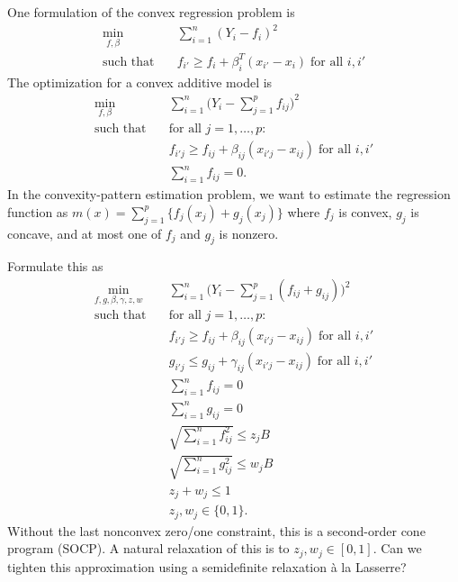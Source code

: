 \documentclass[12pt]{imsart}
\numberwithin{equation}{section}
\theoremstyle{plain}
\theoremstyle{remark}
\begin{document}
\begin{frontmatter}
\end{frontmatter}

\par


One formulation of the convex regression problem is 
\begin{align}
\min_{f,\beta}\quad & \sum_{i=1}^n (Y_i - f_i)^2 \\
\text{such that}\quad & f_{i'} \geq f_i + \beta_i^T(x_{i'}-x_i)
              \; \text{for all $i,i'$}
\end{align}
The optimization for a convex additive model is
\begin{align}
\min_{f,\beta}\quad & \sum_{i=1}^n \bigl(Y_i - \sum_{j=1}^p f_{ij}\bigr)^2 \\
\text{such that}\quad & \text{for all $j=1,\ldots, p$:}\\
& f_{i'j} \geq f_{ij} + \beta_{ij}(x_{i'j}-x_{ij}) \; \text{for all $i,i'$}\\
& \sum_{i=1}^n f_{ij} = 0.
\end{align}
In the convexity-pattern estimation problem, we want to 
estimate the regression function as $m(x) = \sum_{j=1}^p
\bigl\{f_j(x_j) + g_j(x_j)\bigr\}$ where $f_j$ is convex, $g_j$ is concave,
and at most one of $f_j$ and $g_j$ is nonzero.

Formulate this as
\begin{align}
\min_{f,g,\beta,\gamma,z,w}\quad & \sum_{i=1}^n \bigl(Y_i - \sum_{j=1}^p (f_{ij}+g_{ij})\bigr)^2 \\
\text{such that}\quad 
  & \text{for all $j=1,\ldots, p$:}\\
  & f_{i'j} \geq f_{ij} + \beta_{ij}(x_{i'j}-x_{ij}) \; \text{for all $i,i'$}\\
  & g_{i'j} \leq g_{ij} + \gamma_{ij}(x_{i'j}-x_{ij})\; \text{for all $i,i'$}\\
  & \sum_{i=1}^n f_{ij} = 0 \\
  & \sum_{i=1}^n g_{ij} = 0 \\
  & \sqrt{\sum_{i=1}^n f_{ij}^2} \leq z_j B \\
  & \sqrt{\sum_{i=1}^n g_{ij}^2} \leq w_j B \\
  & z_j + w_j \leq 1\\
  & z_j, w_j \in \{0,1\}.
\end{align}
Without the last nonconvex zero/one constraint, this is a
second-order cone program (SOCP).  A natural relaxation of this is
to $z_j, w_j \in[0,1]$.  Can we tighten this approximation
using a semidefinite relaxation \`a la Lasserre?
\end{document}
